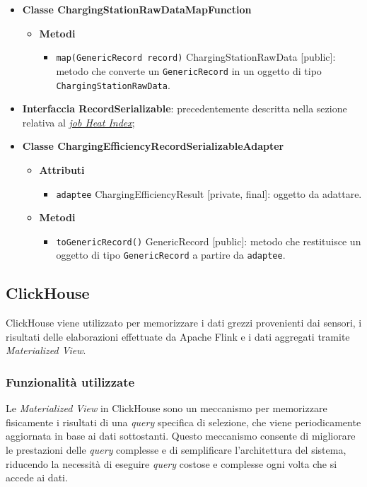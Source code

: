 \begin{itemize}
	\item \textbf{Classe ChargingStationRawDataMapFunction}
	      \begin{itemize}
		      \item \textbf{Metodi}
		            \begin{itemize}
			            \item \texttt{map(GenericRecord record)} ChargingStationRawData [public]: metodo che converte un \texttt{GenericRecord} in un oggetto di tipo \texttt{ChargingStationRawData}.
		            \end{itemize}
	      \end{itemize}
	\item \textbf{Interfaccia RecordSerializable}: precedentemente descritta nella sezione relativa al \hyperref[record_serializable]{\textit{\underline{job Heat Index}}};
	\item \textbf{Classe ChargingEfficiencyRecordSerializableAdapter}
	      \begin{itemize}
		      \item \textbf{Attributi}
		            \begin{itemize}
			            \item \texttt{adaptee} ChargingEfficiencyResult [private, final]: oggetto da adattare.
		            \end{itemize}
		      \item \textbf{Metodi}
		            \begin{itemize}
			            \item \texttt{toGenericRecord()} GenericRecord [public]: metodo che restituisce un oggetto di tipo \texttt{GenericRecord} a partire da \texttt{adaptee}.
		            \end{itemize}
	      \end{itemize}
\end{itemize}

\subsection{ClickHouse}
ClickHouse viene utilizzato per memorizzare i dati grezzi provenienti dai sensori, i risultati delle elaborazioni effettuate da Apache Flink e i dati aggregati tramite
\textit{Materialized View}.\\

\subsubsection{Funzionalità utilizzate}
Le \textit{Materialized View} in ClickHouse sono un meccanismo per memorizzare fisicamente i risultati di una \textit{query} specifica di selezione,
che viene periodicamente aggiornata in base ai dati sottostanti. Questo meccanismo consente di migliorare le prestazioni delle \textit{query} complesse
e di semplificare l'architettura del sistema, riducendo la necessità di eseguire \textit{query} costose e complesse ogni volta che si accede ai dati.

